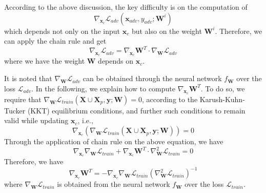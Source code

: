 According to the above discussion, the key difficulty is on the computation of  \begin{equation}
    \nabla_{\textbf{x}_c}\mathcal{L}_{adv}(\textbf{x}_{adv},y_{adv};\textbf{W}^{i})
\end{equation}
which depends not only on the input $\textbf{x}_c$ but also on the weight $\textbf{W}^i$. Therefore, we can apply the chain rule and get 
\begin{equation}
    \nabla_{\textbf{x}_c}\mathcal{L}_{adv}=\nabla_{\textbf{x}_c}\textbf{W}^T \cdot \nabla_{\textbf{W}} \mathcal{L}_{adv}
\end{equation}
where we have the weight $\textbf{W}$ depends on $\textbf{x}_c$. 

It is noted that $\nabla_{\textbf{W}} \mathcal{L}_{adv}$ can be obtained through the neural network $f_{\textbf{W}}$ over the loss $\mathcal{L}_{adv}$. In the following, we explain how to compute $\nabla_{\textbf{x}_c}\textbf{W}^T$. To do so, we require that $\nabla_{\textbf{W}}\mathcal{L}_{train}(\textbf{X}\cup \textbf{X}_p,\textbf{y}; \textbf{W})=0$, according to the Karush-Kuhn-Tucker (KKT) equilibrium conditions, and further such conditions to remain valid while updating $\textbf{x}_c$, i.e., 
\begin{equation}
    \nabla_{\textbf{x}_c}(\nabla_{\textbf{W}}\mathcal{L}_{train}(\textbf{X}\cup \textbf{X}_p,\textbf{y}; \textbf{W})) = 0
\end{equation}
Through the application of chain rule on the above equation, we have 
\begin{equation}
    \nabla_{\textbf{x}_c}\nabla_{\textbf{W}}\mathcal{L}_{train} + \nabla_{\textbf{x}_c}\textbf{W}^T\cdot \nabla_{\textbf{W}}^2 \mathcal{L}_{train} = 0
\end{equation}
Therefore, we have
\begin{equation}
    \nabla_{\textbf{x}_c}\textbf{W}^T=-\nabla_{\textbf{x}_c}\nabla_{\textbf{W}}\mathcal{L}_{train}(\nabla_{\textbf{W}}^2 \mathcal{L}_{train})^{-1}
\end{equation}
where $\nabla_{\textbf{W}}\mathcal{L}_{train}$ is obtained from the neural network $f_{\textbf{W}}$ over the loss $\mathcal{L}_{train}$. 


